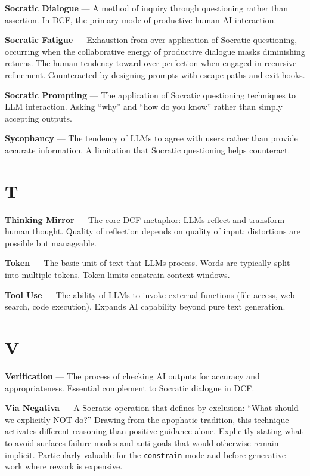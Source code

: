 \textbf{Socratic Dialogue} --- A method of inquiry through questioning rather than assertion. In DCF, the primary mode of productive human-AI interaction.

\textbf{Socratic Fatigue} --- Exhaustion from over-application of Socratic questioning, occurring when the collaborative energy of productive dialogue masks diminishing returns. The human tendency toward over-perfection when engaged in recursive refinement. Counteracted by designing prompts with escape paths and exit hooks.

\textbf{Socratic Prompting} --- The application of Socratic questioning techniques to LLM interaction. Asking ``why'' and ``how do you know'' rather than simply accepting outputs.

\textbf{Sycophancy} --- The tendency of LLMs to agree with users rather than provide accurate information. A limitation that Socratic questioning helps counteract.

\section*{T}

\textbf{Thinking Mirror} --- The core DCF metaphor: LLMs reflect and transform human thought. Quality of reflection depends on quality of input; distortions are possible but manageable.

\textbf{Token} --- The basic unit of text that LLMs process. Words are typically split into multiple tokens. Token limits constrain context windows.

\textbf{Tool Use} --- The ability of LLMs to invoke external functions (file access, web search, code execution). Expands AI capability beyond pure text generation.

\section*{V}

\textbf{Verification} --- The process of checking AI outputs for accuracy and appropriateness. Essential complement to Socratic dialogue in DCF.

\textbf{Via Negativa} --- A Socratic operation that defines by exclusion: ``What should we explicitly NOT do?'' Drawing from the apophatic tradition, this technique activates different reasoning than positive guidance alone. Explicitly stating what to avoid surfaces failure modes and anti-goals that would otherwise remain implicit. Particularly valuable for the \texttt{constrain} mode and before generative work where rework is expensive.

